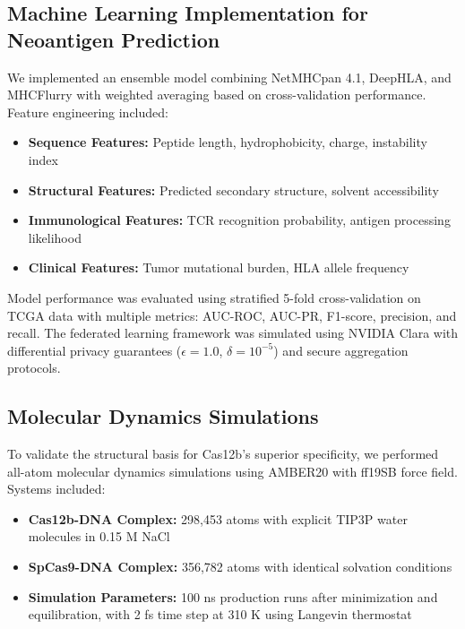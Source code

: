\documentclass[12pt,a4paper]{article}
\begin{document}
\subsection{Machine Learning Implementation for Neoantigen Prediction}

We implemented an ensemble model combining NetMHCpan 4.1, DeepHLA, and MHCFlurry with weighted averaging based on cross-validation performance. Feature engineering included:

\begin{itemize}
    \item \textbf{Sequence Features:} Peptide length, hydrophobicity, charge, instability index
    \item \textbf{Structural Features:} Predicted secondary structure, solvent accessibility
    \item \textbf{Immunological Features:} TCR recognition probability, antigen processing likelihood
    \item \textbf{Clinical Features:} Tumor mutational burden, HLA allele frequency
\end{itemize}

Model performance was evaluated using stratified 5-fold cross-validation on TCGA data with multiple metrics: AUC-ROC, AUC-PR, F1-score, precision, and recall. The federated learning framework was simulated using NVIDIA Clara with differential privacy guarantees ($\epsilon=1.0$, $\delta=10^{-5}$) and secure aggregation protocols.

\subsection{Molecular Dynamics Simulations}

To validate the structural basis for Cas12b's superior specificity, we performed all-atom molecular dynamics simulations using AMBER20 with ff19SB force field. Systems included:

\begin{itemize}
    \item \textbf{Cas12b-DNA Complex:} 298,453 atoms with explicit TIP3P water molecules in 0.15 M NaCl
    \item \textbf{SpCas9-DNA Complex:} 356,782 atoms with identical solvation conditions
    \item \textbf{Simulation Parameters:} 100 ns production runs after minimization and equilibration, with 2 fs time step at 310 K using Langevin thermostat
\end{itemize}
\end{document}
